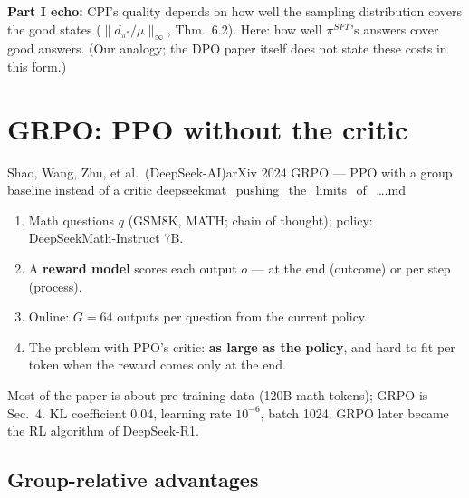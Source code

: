 \begin{notebox}
\textbf{Part I echo:} CPI's quality depends on how well the sampling distribution covers the good states ($\|d_{\pi^*}/\mu\|_\infty$, Thm.~6.2). Here: how well $\pi^{SFT}$'s answers cover good answers. (Our analogy; the DPO paper itself does not state these costs in this form.)
\end{notebox}

\section{GRPO: PPO without the critic}\label{sec:grpo}

  {Shao, Wang, Zhu, et al.\ (DeepSeek-AI)}{arXiv 2024}
  {GRPO --- PPO with a group baseline instead of a critic}
  {deepseekmat\_pushing\_the\_limits\_of\_\ldots.md}

\begin{enumerate}
  \item Math questions $q$ (GSM8K, MATH; chain of thought); policy: DeepSeekMath-Instruct 7B.
  \item A \textbf{reward model} scores each output $o$ --- at the end (outcome) or per step (process).
  \item Online: $G=64$ outputs per question from the current policy.
  \item The problem with PPO's critic: \textbf{as large as the policy}, and hard to fit per token when the reward comes only at the end.
\end{enumerate}

{\small Most of the paper is about pre-training data (120B math tokens); GRPO is Sec.~4. KL coefficient 0.04, learning rate $10^{-6}$, batch 1024. GRPO later became the RL algorithm of DeepSeek-R1.}

\subsection{Group-relative advantages}

